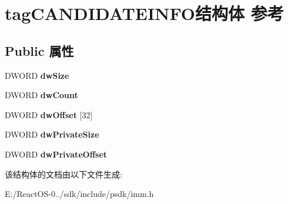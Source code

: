 \hypertarget{structtag_c_a_n_d_i_d_a_t_e_i_n_f_o}{}\section{tag\+C\+A\+N\+D\+I\+D\+A\+T\+E\+I\+N\+F\+O结构体 参考}
\label{structtag_c_a_n_d_i_d_a_t_e_i_n_f_o}
\subsection*{Public 属性}
\begin{DoxyCompactItemize}
\item 
\mbox{\label{structtag_c_a_n_d_i_d_a_t_e_i_n_f_o_a93862ef2d9087accc07f03fd894dfdb9}} 
D\+W\+O\+RD {\bfseries dw\+Size}
\item 
\mbox{\label{structtag_c_a_n_d_i_d_a_t_e_i_n_f_o_aed47f51c5e1473aefe8a7a680de57a54}} 
D\+W\+O\+RD {\bfseries dw\+Count}
\item 
\mbox{\label{structtag_c_a_n_d_i_d_a_t_e_i_n_f_o_ad82b4f6487643ddcc28866e964135a04}} 
D\+W\+O\+RD {\bfseries dw\+Offset} \mbox{[}32\mbox{]}
\item 
\mbox{\label{structtag_c_a_n_d_i_d_a_t_e_i_n_f_o_ab880210ac15a5937606e57dd040912dd}} 
D\+W\+O\+RD {\bfseries dw\+Private\+Size}
\item 
\mbox{\label{structtag_c_a_n_d_i_d_a_t_e_i_n_f_o_a6b46b7c4213a4925a86fdf43d2fce81b}} 
D\+W\+O\+RD {\bfseries dw\+Private\+Offset}
\end{DoxyCompactItemize}


该结构体的文档由以下文件生成\+:\begin{DoxyCompactItemize}
\item 
E\+:/\+React\+O\+S-\/0../sdk/include/psdk/imm.\+h\end{DoxyCompactItemize}
